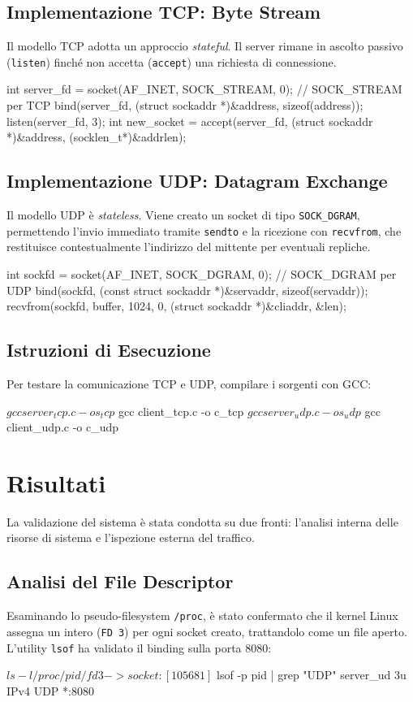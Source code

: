 \documentclass[a4paper,12pt]{article}
\begin{document}
\subsection{Implementazione TCP: Byte Stream}
Il modello TCP adotta un approccio \textit{stateful}. Il server rimane in ascolto passivo (\texttt{listen}) finché non accetta (\texttt{accept}) una richiesta di connessione.
\begin{ccode}
int server_fd = socket(AF_INET, SOCK_STREAM, 0); // SOCK_STREAM per TCP
bind(server_fd, (struct sockaddr *)&address, sizeof(address));
listen(server_fd, 3);
int new_socket = accept(server_fd, (struct sockaddr *)&address, (socklen_t*)&addrlen);
\end{ccode}

\subsection{Implementazione UDP: Datagram Exchange}
Il modello UDP è \textit{stateless}. Viene creato un socket di tipo \texttt{SOCK\_DGRAM}, permettendo l'invio immediato tramite \texttt{sendto} e la ricezione con \texttt{recvfrom}, che restituisce contestualmente l'indirizzo del mittente per eventuali repliche.
\begin{ccode}
int sockfd = socket(AF_INET, SOCK_DGRAM, 0); // SOCK_DGRAM per UDP
bind(sockfd, (const struct sockaddr *)&servaddr, sizeof(servaddr));
recvfrom(sockfd, buffer, 1024, 0, (struct sockaddr *)&cliaddr, &len);
\end{ccode}


\subsection{Istruzioni di Esecuzione}
Per testare la comunicazione TCP e UDP, compilare i sorgenti con GCC:
\begin{terminal}[Build]
$ gcc server_tcp.c -o s_tcp
$ gcc client_tcp.c -o c_tcp
$ gcc server_udp.c -o s_udp
$ gcc client_udp.c -o c_udp
\end{terminal}

\section{Risultati}
La validazione del sistema è stata condotta su due fronti: l'analisi interna delle risorse di sistema e l'ispezione esterna del traffico.

\subsection{Analisi del File Descriptor}
Esaminando lo pseudo-filesystem \texttt{/proc}, è stato confermato che il kernel Linux assegna un intero (\texttt{FD 3}) per ogni socket creato, trattandolo come un file aperto. L'utility \texttt{lsof} ha validato il binding sulla porta 8080:
\begin{terminal}[Ispezione FD]
$ ls -l /proc/pid/fd
3 -> socket:[105681]
$ lsof -p pid | grep "UDP"
server_ud  3u  IPv4  UDP *:8080 
\end{terminal}
\end{document}

